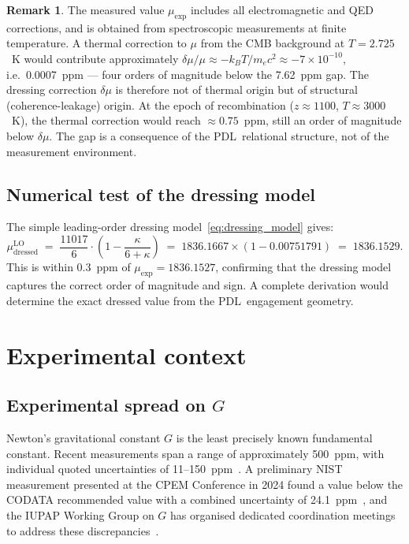 \documentclass[11pt,a4paper]{article}
\theoremstyle{definition}
\newtheorem{remark}[theorem]{Remark}
\newcommand{\PDL}{\textnormal{PDL}}
\newcommand{\kap}{\kappa}
\newcommand{\muexp}{\mu_{\mathrm{exp}}}
\begin{document}
\begin{remark}
\label{rem:dressing_temperature}
The measured value $\muexp$ includes all electromagnetic and QED corrections, and is obtained from spectroscopic measurements at finite temperature. A thermal correction to $\mu$ from the CMB background at $T = 2.725$~K would contribute approximately $\delta\mu/\mu \approx -k_BT/m_ec^2 \approx -7\times10^{-10}$, i.e.\ 0.0007~ppm --- four orders of magnitude below the 7.62~ppm gap. The dressing correction $\delta\mu$ is therefore not of thermal origin but of structural (coherence-leakage) origin. At the epoch of recombination ($z \approx 1100$, $T \approx 3000$~K), the thermal correction would reach $\approx 0.75$~ppm, still an order of magnitude below $\delta\mu$. The gap is a consequence of the \PDL\ relational structure, not of the measurement environment.
\end{remark}

\subsection{Numerical test of the dressing model}
\label{subsec:dressing_test}

The simple leading-order dressing model~\eqref{eq:dressing_model} gives:
\begin{equation}
\mu_{\mathrm{dressed}}^{\mathrm{LO}} \;=\; \frac{11017}{6}\cdot\left(1-\frac{\kap}{6+\kap}\right) \;=\; 1836.1667\times(1-0.00751791) \;=\; 1836.1529.
\end{equation}
This is within 0.3~ppm of $\muexp = 1836.1527$, confirming that the dressing model captures the correct order of magnitude and sign. A complete derivation would determine the exact dressed value from the \PDL\ engagement geometry.

\section{Experimental context}
\label{sec:experimental}

\subsection{Experimental spread on \texorpdfstring{$G$}{G}}
\label{subsec:G_spread}

Newton's gravitational constant $G$ is the least precisely known fundamental constant. Recent measurements span a range of approximately 500~ppm, with individual quoted uncertainties of 11--150~ppm~\cite{Quinn_2013,Rosi_2014,Li_2018,CODATA_2022}. A preliminary NIST measurement presented at the CPEM Conference in 2024 found a value below the CODATA recommended value with a combined uncertainty of 24.1~ppm~\cite{NIST_2024}, and the IUPAP Working Group on $G$ has organised dedicated coordination meetings to address these discrepancies~\cite{IUPAP_WG13_2025}.
\end{document}
